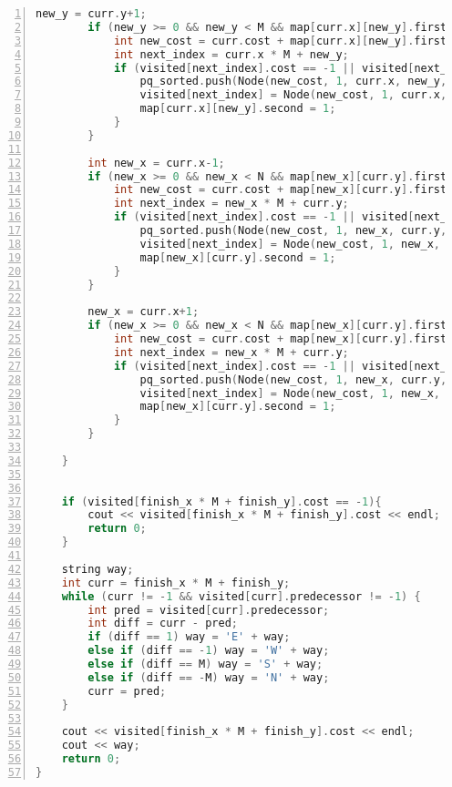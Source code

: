 \documentclass{article}
\begin{document}
\begin{lstlisting}[language=C++, frame=single, basicstyle=\ttfamily, numbers=left, numberstyle=\tiny]
        new_y = curr.y+1;
        if (new_y >= 0 && new_y < M && map[curr.x][new_y].first != 666 && !map[curr.x][new_y].second) {
            int new_cost = curr.cost + map[curr.x][new_y].first;
            int next_index = curr.x * M + new_y;
            if (visited[next_index].cost == -1 || visited[next_index].cost > new_cost) {
                pq_sorted.push(Node(new_cost, 1, curr.x, new_y, curr_index));
                visited[next_index] = Node(new_cost, 1, curr.x, new_y, curr_index);
                map[curr.x][new_y].second = 1;
            }
        }

        int new_x = curr.x-1;
        if (new_x >= 0 && new_x < N && map[new_x][curr.y].first != 666 && !map[new_x][curr.y].second) {
            int new_cost = curr.cost + map[new_x][curr.y].first;
            int next_index = new_x * M + curr.y;
            if (visited[next_index].cost == -1 || visited[next_index].cost > new_cost) {
                pq_sorted.push(Node(new_cost, 1, new_x, curr.y, curr_index));
                visited[next_index] = Node(new_cost, 1, new_x, curr.y, curr_index);
                map[new_x][curr.y].second = 1;
            }
        }

        new_x = curr.x+1;
        if (new_x >= 0 && new_x < N && map[new_x][curr.y].first != 666 && !map[new_x][curr.y].second) {
            int new_cost = curr.cost + map[new_x][curr.y].first;
            int next_index = new_x * M + curr.y;
            if (visited[next_index].cost == -1 || visited[next_index].cost > new_cost) {
                pq_sorted.push(Node(new_cost, 1, new_x, curr.y, curr_index));
                visited[next_index] = Node(new_cost, 1, new_x, curr.y, curr_index);
                map[new_x][curr.y].second = 1;
            }
        }

    }

    
    if (visited[finish_x * M + finish_y].cost == -1){
        cout << visited[finish_x * M + finish_y].cost << endl;
        return 0;
    } 

    string way;
    int curr = finish_x * M + finish_y;
    while (curr != -1 && visited[curr].predecessor != -1) {
        int pred = visited[curr].predecessor;
        int diff = curr - pred;
        if (diff == 1) way = 'E' + way;   
        else if (diff == -1) way = 'W' + way; 
        else if (diff == M) way = 'S' + way; 
        else if (diff == -M) way = 'N' + way;
        curr = pred;
    }
    
    cout << visited[finish_x * M + finish_y].cost << endl;
    cout << way;
    return 0;
}
\end{lstlisting}
\end{document}
